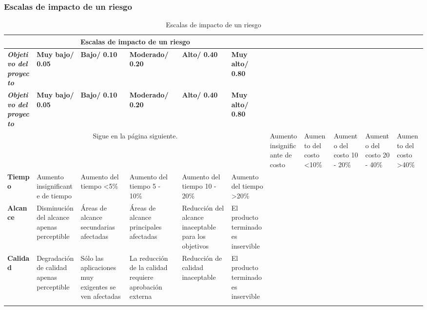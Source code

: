 \subsubsection{Escalas de impacto de un riesgo}
\begin{longtable}{| p{2.5cm} |  p{2.5cm} |  p{2.5cm} |  p{2.5cm} |  p{2.5cm} |  p{2.7cm} |}

\hline
\multicolumn{6}{|c|}{\textbf{Escalas de impacto de un riesgo}} \\ \hline
\textit{\textbf{Objetivo del proyecto}} &  \textbf{Muy bajo/ 0.05} & \textbf{Bajo/ 0.10} & \textbf{Moderado/ 0.20} & \textbf{Alto/ 0.40} & \textbf{Muy alto/ 0.80}\\
\hline \hline
\endfirsthead

\hline
\textit{\textbf{Objetivo del proyecto}} &  \textbf{Muy bajo/ 0.05} & \textbf{Bajo/ 0.10} & \textbf{Moderado/ 0.20} & \textbf{Alto/ 0.40} & \textbf{Muy alto/ 0.80}\\
\hline \hline
\endhead

\multicolumn{6}{|c|}{Sigue en la página siguiente.}
\endfoot

\endlastfoot


\textbf{Costo} & Aumento insignificante de costo & Aumento del costo <10\% &  Aumento del costo 10 - 20\% & Aumento del costo 20 - 40\% & Aumento del costo >40\%  \\ \hline
\textbf{Tiempo} & Aumento insignificante de tiempo & Aumento del tiempo <5\% &  Aumento del tiempo 5 - 10\% & Aumento del tiempo 10 - 20\% & Aumento del tiempo >20\%  \\ \hline
\textbf{Alcance} & Disminución del alcance apenas perceptible & Áreas de alcance secundarias afectadas & Áreas de alcance principales afectadas & Reducción del alcance inaceptable para los objetivos &  El producto terminado es inservible\\ \hline
\textbf{Calidad} & Degradación de calidad apenas perceptible & Sólo las aplicaciones muy exigentes se ven afectadas & La reducción de la calidad requiere aprobación externa & Reducción de calidad inaceptable &  El producto terminado es inservible\\ \hline


\caption{Escalas de impacto de un riesgo}
\label{Riesgos}
\end{longtable}


